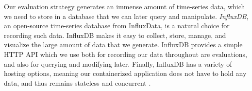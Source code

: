 Our evaluation strategy generates an immense amount of time-series data, which
we need to store in a database that we can later query and manipulate.
\textit{InfluxDB}, an open-source time-series database from InfluxData, is a
natural choice for recording such data. InfluxDB makes it easy to collect,
store, manage, and visualize the large amount of data that we generate.
InfluxDB provides a simple HTTP API which we use both for recording our data
throughout are evaluations, and also for querying and modifying later.
Finally, InfluxDB has a variety of hosting options, meaning our containerized application
does not have to hold any data, and thus remains stateless and concurrent
\cite{influxdb}.
